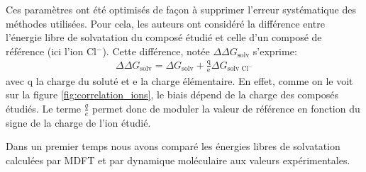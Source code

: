 Ces paramètres ont été optimisés de façon à supprimer l'erreur systématique des méthodes utilisées.
Pour cela, les auteurs ont considéré la différence entre l'énergie libre de solvatation du composé étudié et celle d'un composé de référence (ici l'ion Cl$^-$). Cette différence, notée $\Delta\Delta G_{\text{solv}}$ s'exprime:
\begin{eqnarray}
\Delta\Delta G_{\text{solv}} = \Delta G_{\text{solv}} + \frac{\text{q}}{\text{e}} \Delta G_{\text{solv Cl}^{-}}
\end{eqnarray}
\noindent avec q la charge du soluté et e la charge élémentaire. En effet, comme on le voit sur la figure \ref{fig:correlation_ions}, le biais dépend de la charge des composés étudiés. Le terme $\frac{q}{e}$ permet donc de moduler la valeur de référence en fonction du signe de la charge de l'ion étudié.

Dans un premier temps nous avons comparé les énergies libres de solvatation calculées par MDFT et par dynamique moléculaire\cite{Horinek_rational_2009} aux valeurs expérimentales\cite{Marcus_simple_1994, Noyes_thermodynamics_1962}.



